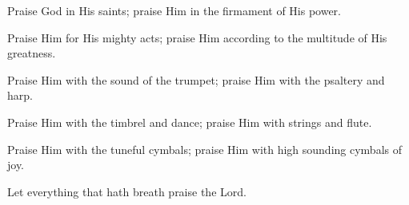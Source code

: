 Praise God in His saints; praise Him in the firmament of His power.

Praise Him for His mighty acts; praise Him according to the multitude of His greatness.

Praise Him with the sound of the trumpet; praise Him with the psaltery and harp.

Praise Him with the timbrel and dance; praise Him with strings and flute.

Praise Him with the tuneful cymbals; praise Him with high sounding cymbals of joy.

Let everything that hath breath praise the Lord.
